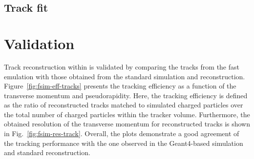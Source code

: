 \subsection{Track fit}


\section{Validation}
\label{sec:fsim-validation}

Track reconstruction within \FSIM is validated by comparing the tracks from the fast emulation with those obtained from the standard simulation and reconstruction. Figure~\ref{fig:fsim-eff-tracks} presents the tracking efficiency as a function of the transverse momentum and pseudorapidity. Here, the tracking efficiency is defined as the ratio of reconstructed tracks matched to simulated charged particles over the total number of charged particles within the tracker volume. Furthermore, the obtained resolution of the transverse momentum for reconstructed tracks is shown in Fig.~\ref{fig:fsim-res-track}. Overall, the plots demonstrate a good agreement of the \FSIM tracking performance with the one observed in the Geant4-based simulation and standard reconstruction.


